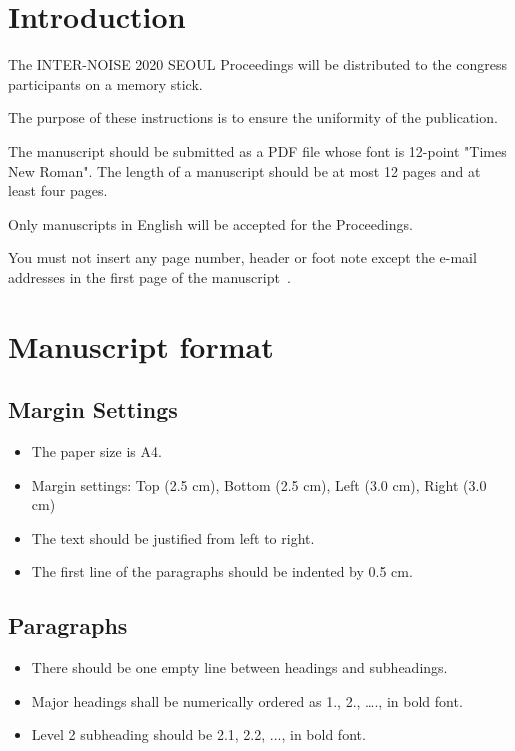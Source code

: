 \documentclass[a4paper,12pt]{article}
\begin{document}
\section{Introduction}

The INTER-NOISE 2020 SEOUL Proceedings will be distributed to the congress participants on a memory stick.\par
The purpose of these instructions is to ensure the uniformity of the publication.\par
The manuscript should be submitted as a PDF file whose font is 12-point "Times New Roman". The length of a manuscript should be at most 12 pages and at least four pages.\par
Only manuscripts in English will be accepted for the Proceedings.\par
You must not insert any page number, header or foot note except the e-mail addresses in the first page of the manuscript~\cite{herranz19}.


\section{Manuscript format}
\subsection{Margin Settings}

\begin{itemize}
	\item The paper size is A4.
	\item Margin settings: Top (2.5 cm), Bottom (2.5 cm), Left (3.0 cm), Right (3.0 cm)
	\item The text should be justified from left to right.
	\item The first line of the paragraphs should be indented by 0.5 cm. 
\end{itemize}

\subsection{Paragraphs}

\begin{itemize}
	\item There should be one empty line between headings and subheadings.
	\item Major headings shall be numerically ordered as 1., 2., …., in bold font.
	\item Level 2 subheading should be 2.1, 2.2, ..., in bold font.
\end{itemize}
\end{document}
